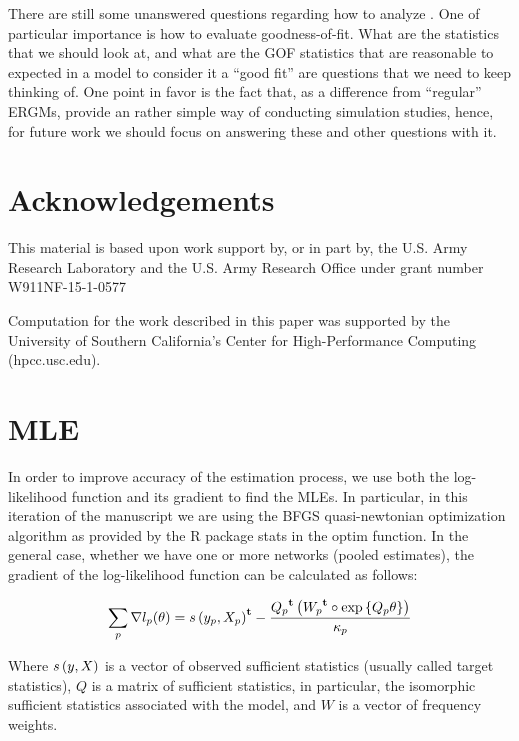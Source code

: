 \documentclass[12pt]{article}
\begin{document}
There are still some unanswered questions regarding how to analyze \ergmitos{}. One of particular importance is how to evaluate goodness-of-fit. What are the statistics that we should look at, and what are the GOF statistics that are reasonable to expected in a model to consider it a ``good fit'' are questions that we need to keep thinking of. One point in favor is the fact that, as a difference from ``regular'' ERGMs, \ergmitos{} provide an rather simple way of conducting simulation studies, hence, for future work we should focus on answering these and other questions with it.

\section{Acknowledgements}

This material is based upon work support by, or in part by, the U.S. Army Research Laboratory and the U.S. Army Research Office under grant number W911NF-15-1-0577

Computation for the work described in this paper was supported by the University of Southern California’s Center for High-Performance Computing (hpcc.usc.edu).

\clearpage




\clearpage

\appendix

\section{MLE}

In order to improve accuracy of the estimation process, we use both the log-likelihood function and its gradient to find the MLEs. In particular, in this iteration of the manuscript we are using the BFGS quasi-newtonian optimization algorithm as provided by the R package stats in the optim function. In the general case, whether we have one or more networks (pooled estimates), the gradient of the log-likelihood function can be calculated as follows:

\begin{equation}
\sum_{p}\nabla l_p(\theta) = {s\left(y_p, X_p\right)}^\mathbf{t} - \frac{{Q_p}^\mathbf{t}\left({W_p}^\mathbf{t} \circ \mbox{exp}\left\{Q_p \theta\right\}\right)}{\kappa_p}
\end{equation}

Where $s\left(y, X\right)$ is a vector of observed sufficient statistics (usually called target statistics), $Q$ is a matrix of sufficient statistics, in particular, the isomorphic sufficient statistics associated with the model, and $W$ is a vector of frequency weights.
\end{document}

